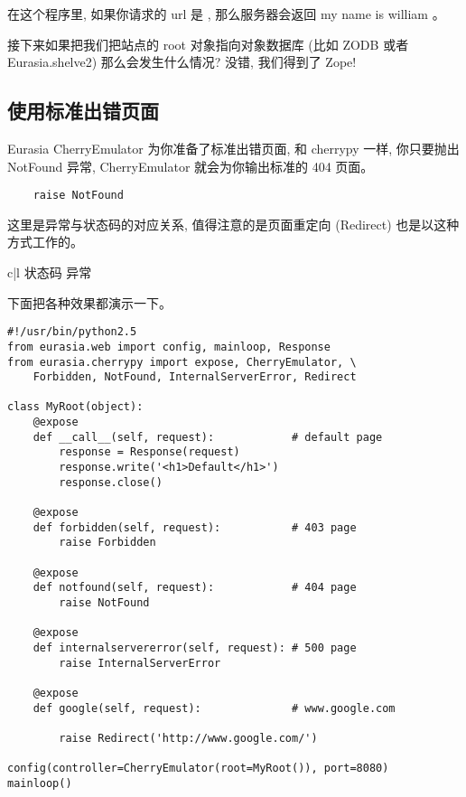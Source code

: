 \documentclass{manual}
\begin{document}
在这个程序里, 如果你请求的 url 是  , 那么服务器会返回 my name is william 。

接下来如果把我们把站点的 root 对象指向对象数据库 (比如 ZODB 或者 Eurasia.shelve2) 那么会发生什么情况? 没错, 我们得到了 Zope!

\subsection{使用标准出错页面}

Eurasia CherryEmulator 为你准备了标准出错页面, 和 cherrypy 一样, 你只要抛出 NotFound 异常, CherryEmulator 就会为你输出标准的 404 页面。

\begin{verbatim}
	raise NotFound
\end{verbatim}

这里是异常与状态码的对应关系, 值得注意的是页面重定向 (Redirect) 也是以这种方式工作的。

\begin{tableii}{c|l}{}{ 状态码 }{ 异常 }
\end{tableii}

下面把各种效果都演示一下。

\begin{verbatim}
#!/usr/bin/python2.5
from eurasia.web import config, mainloop, Response
from eurasia.cherrypy import expose, CherryEmulator, \
	Forbidden, NotFound, InternalServerError, Redirect

class MyRoot(object):
	@expose
	def __call__(self, request):            # default page
		response = Response(request)
		response.write('<h1>Default</h1>')
		response.close()

	@expose
	def forbidden(self, request):           # 403 page
		raise Forbidden

	@expose
	def notfound(self, request):            # 404 page
		raise NotFound

	@expose
	def internalservererror(self, request): # 500 page
		raise InternalServerError

	@expose
	def google(self, request):              # www.google.com

		raise Redirect('http://www.google.com/')

config(controller=CherryEmulator(root=MyRoot()), port=8080)
mainloop()
\end{verbatim}
\end{document}
